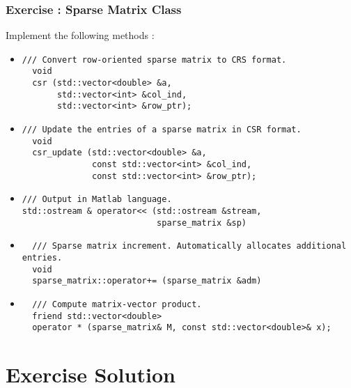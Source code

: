 \documentclass{beamer}
\begin{document}
\begin{frame}[fragile]
\frametitle{Exercise : Sparse Matrix Class}
\tiny Implement the following methods :
\begin{itemize}

\item 
\tiny\begin{lstlisting}
/// Convert row-oriented sparse matrix to CRS format.
  void
  csr (std::vector<double> &a,
       std::vector<int> &col_ind,
       std::vector<int> &row_ptr);
\end{lstlisting} \normalsize

\item 
\tiny\begin{lstlisting}
/// Update the entries of a sparse matrix in CSR format.
  void
  csr_update (std::vector<double> &a,
              const std::vector<int> &col_ind,
              const std::vector<int> &row_ptr);
\end{lstlisting} \normalsize

\item 
\tiny\begin{lstlisting}
/// Output in Matlab language.
std::ostream & operator<< (std::ostream &stream,
                           sparse_matrix &sp)
\end{lstlisting} \normalsize

\item 
\tiny\begin{lstlisting}
  /// Sparse matrix increment. Automatically allocates additional entries.
  void 
  sparse_matrix::operator+= (sparse_matrix &adm)
\end{lstlisting} \normalsize

\item 
\tiny\begin{lstlisting}
  /// Compute matrix-vector product.
  friend std::vector<double>
  operator * (sparse_matrix& M, const std::vector<double>& x);
\end{lstlisting} \normalsize

\end{itemize}
\end{frame}

\section{Exercise Solution}
\end{document}
